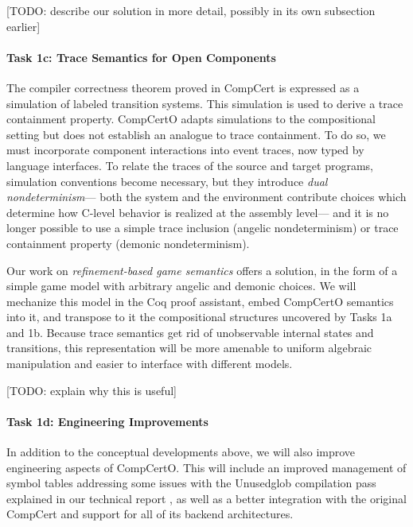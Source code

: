 [TODO: describe our solution in more detail,
possibly in its own subsection earlier]

\vspace*{-2ex}
\paragraph*{Task 1c: Trace Semantics for Open Components}
The compiler correctness theorem proved in CompCert
is expressed as a simulation of labeled transition systems.
This simulation is used to derive
a trace containment property.
CompCertO adapts simulations
to the compositional setting
but does not establish
an analogue to trace containment.
To do so,
we must incorporate component interactions
into event traces,
now typed by language interfaces.
To relate the traces of the source and target programs,
simulation conventions become necessary,
but they introduce
\emph{dual nondeterminism}---%
both the system and the environment contribute choices
which determine how C-level behavior is realized at the assembly level---%
and it is no longer possible to use
a simple trace inclusion (angelic nondeterminism)
or trace containment property (demonic nondeterminism).

Our work on \emph{refinement-based game semantics} \cite{koenig20}
offers a solution,
in the form of a simple game model
with arbitrary angelic and demonic choices.
We will mechanize this model in the Coq proof assistant,
embed CompCertO semantics into it,
and transpose to it the compositional structures uncovered by Tasks 1a and 1b.
Because trace semantics
get rid of unobservable internal states and transitions,
this representation will be more amenable to uniform algebraic manipulation
and easier to interface with different models.

[TODO: explain why this is useful]

\vspace*{-2ex}
\paragraph*{Task 1d: Engineering Improvements}

In addition to the conceptual developments above,
we will also improve engineering aspects of CompCertO.
This will include an improved management of symbol tables
addressing some issues with the \textsf{Unusedglob} compilation pass
explained in our technical report \cite[\S{}A.3]{compcerto21tr},
as well as a better integration with the original CompCert
and support for all of its backend architectures.


